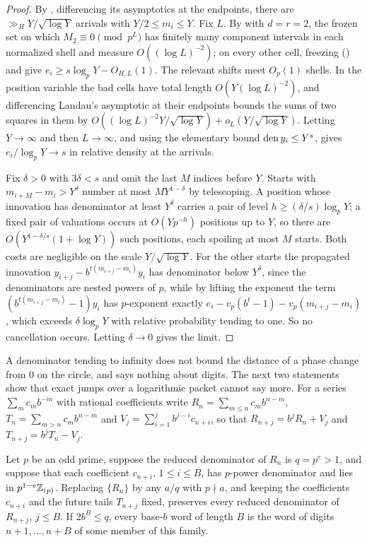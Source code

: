 \documentclass[11pt]{article}
\newcommand{\fr}[1]{\{#1\}}
\begin{document}
\begin{proof}
By , differencing its asymptotics at the endpoints, there are $\gg_HY/\sqrt{\log Y}$ arrivals with
$Y/2\le m_i\le Y$. Fix $L$. By  with $d=r=2$, the frozen set on which $M_2\equiv0\pmod{p^L}$ has
finitely many component intervals in each normalized shell and measure $O((\log L)^{-2})$; on every other cell,
freezing () and  give $e_i\ge s\log_pY-O_{H,L}(1)$. The relevant shifts meet
$O_p(1)$ shells. In the position variable the bad cells have total length $O(Y(\log L)^{-2})$, and differencing
Landau's asymptotic at their endpoints bounds the sums of two squares in them by
$O((\log L)^{-2}Y/\sqrt{\log Y})+o_L(Y/\sqrt{\log Y})$. Letting $Y\to\infty$ and then $L\to\infty$, and using the
elementary bound $\operatorname{den} y_i\le Y^s$, gives $e_i/\log_pY\to s$ in relative density at the arrivals.

Fix $\delta>0$ with $3\delta<s$ and omit the last $M$ indices before $Y$. Starts with $m_{i+M}-m_i>Y^\delta$ number at
most $MY^{1-\delta}$ by telescoping. A position whose innovation has denominator at least $Y^\delta$ carries a pair of
level $h\ge(\delta/s)\log_pY$; a fixed pair of valuations occurs at $O(Yp^{-h})$ positions up to $Y$, so there are
$O(Y^{1-\delta/s}(1+\log Y))$ such positions, each spoiling at most $M$ starts. Both costs are negligible on the scale
$Y/\sqrt{\log Y}$. For the other starts the propagated innovation $y_{i+j}-b^{t(m_{i+j}-m_i)}y_i$ has denominator below
$Y^\delta$, since the denominators are nested powers of $p$, while by lifting the exponent the term
$(b^{t(m_{i+j}-m_i)}-1)y_i$ has $p$-exponent exactly $e_i-v_p(b^t-1)-v_p(m_{i+j}-m_i)$, which exceeds $\delta\log_pY$
with relative probability tending to one. So no cancellation occurs. Letting $\delta\to0$ gives the limit.
\end{proof}

A denominator tending to infinity does not bound the distance of a phase change from $0$ on the circle, and
 says nothing about digits. The next two statements show that exact jumps over a
logarithmic packet cannot say more. For a series $\sum_mc_mb^{-m}$ with rational coefficients write
$R_n=\sum_{m\le n}c_mb^{n-m}$, $T_n=\sum_{m>n}c_mb^{n-m}$ and $V_j=\sum_{i=1}^jb^{j-i}c_{n+i}$, so that
$R_{n+j}=b^jR_n+V_j$ and $T_{n+j}=b^jT_n-V_j$.

\begin{lemma}[Packets]\label{lem:packet}
Let $p$ be an odd prime, suppose the reduced denominator of $R_n$ is $q=p^e>1$, and suppose that each coefficient
$c_{n+i}$, $1\le i\le B$, has $p$-power denominator and lies in $p^{1-e}\mathbb Z_{(p)}$. Replacing $\fr{R_n}$ by any $a/q$ with
$p\nmid a$, and keeping the coefficients $c_{n+i}$ and the future tails $T_{n+j}$ fixed, preserves every reduced
denominator of $R_{n+j}$, $j\le B$. If $2b^B\le q$, every base-$b$ word of length $B$ is the word of digits
$n+1,\ldots,n+B$ of some member of this family.
\end{lemma}
\end{document}
